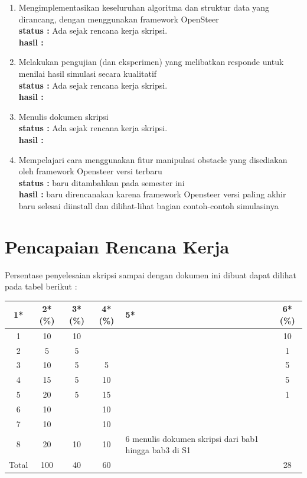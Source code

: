 \documentclass[a4paper,twoside]{article}
\begin{document}
\begin{enumerate}
		\item Mengimplementasikan keseluruhan algoritma dan struktur data yang dirancang, dengan menggunakan framework OpenSteer \\
		{\bf status :} Ada sejak rencana kerja skripsi.\\
		{\bf hasil :}

		\item Melakukan pengujian (dan eksperimen) yang melibatkan responde untuk menilai hasil simulasi secara kualitatif\\
		{\bf status :} Ada sejak rencana kerja skripsi.\\
		{\bf hasil :}

		\item Menulis dokumen skripsi\\
		{\bf status :} Ada sejak rencana kerja skripsi.\\
		{\bf hasil :} \lipsum[1]
		
		\item Mempelajari cara menggunakan fitur manipulasi obstacle yang disediakan oleh framework Opensteer versi terbaru\\
		{\bf status :} baru ditambahkan pada semester ini\\
		{\bf hasil :} baru direncanakan karena framework Opensteer versi paling akhir baru selesai diinstall dan dilihat-lihat bagian contoh-contoh simulasinya
		

	\end{enumerate}

%


\section{Pencapaian Rencana Kerja}
Persentase penyelesaian skripsi sampai dengan dokumen ini dibuat dapat dilihat pada tabel berikut :

\begin{center}
  \begin{tabular}{ | c | c | c | c | l | c |}
    \hline
    1*  & 2*(\%) & 3*(\%) & 4*(\%) &5* &6*(\%)\\ \hline \hline
    1   & 10  & 10  &  &  & 10 \\ \hline
    2   & 5 & 5  &   &  & 1 \\ \hline
    3   & 10  & 5  & 5 &  & 5 \\ \hline
    4   & 15  & 5  &  10 & & 5 \\ \hline
    5   & 20  & 5  & 15 & & 1 \\ \hline
    6   & 10 &   & 10  &  & \\\hline
    7   & 10  &   & 10 &  &  \\ \hline
    8   & 20  & 10 & 10  & 6 {\footnotesize menulis dokumen skripsi dari bab1 hingga bab3 di S1}  &\\ \hline
    Total  & 100  & 40  & 60 &  & 28\\ \hline
                          \end{tabular}
\end{center}
\end{document}
